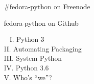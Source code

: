 \documentclass[1610,20pt]{beamer}
\newcommand\sk{\par\bigskip\bigskip\par}
\begin{document}
\begin{center}
\begin{frame}[fragile]
    \sk

    \#fedora-python on Freenode

    \sk

    fedora-python on Github
\end{frame}

{
\begin{frame}[fragile]~
    {\color{mutegray} I. Python 3} \\
    {\color{mutegray} II. Automating Packaging} \\
    {\color{mutegray} III. System Python} \\
    {\color{mutegray} IV. Python 3.6} \\
    {\color{mutegray} V. Who's “we”?} \\
\end{frame}
}

\end{center}
\end{document}
